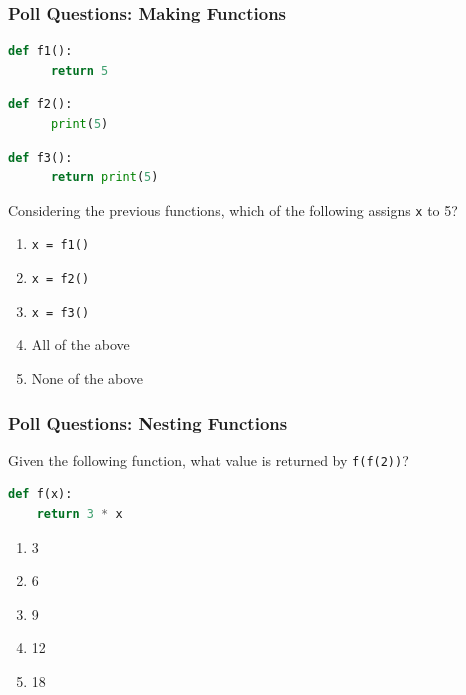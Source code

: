 \documentclass{beamer}
\begin{document}
%
%
\begin{frame}[fragile]
  \frametitle{Poll Questions: Making Functions}
  \begin{minipage}{0.29\textwidth}
    \centering
    \begin{lstlisting}[language=Python, autogobble]
    def f1():
      return 5
    \end{lstlisting}
  \end{minipage}
  \hfill
  \begin{minipage}{0.29\textwidth}
    \centering
    \begin{lstlisting}[language=Python, autogobble]
    def f2():
      print(5)
    \end{lstlisting}
  \end{minipage}
  \hfill
  \begin{minipage}{0.29\textwidth}
    \centering
    \begin{lstlisting}[language=Python, autogobble]
    def f3():
      return print(5)
    \end{lstlisting}
  \end{minipage}
  \vfill
  Considering the previous functions, which of the following assigns \lstinline|x| to 5?
  \centering
  \begin{enumerate}[A]
    \item \lstinline|x = f1()|
    \item \lstinline|x = f2()|
    \item \lstinline|x = f3()|
    \item All of the above
    \item None of the above
  \end{enumerate}
\end{frame}

%
%
\begin{frame}[fragile]
  \frametitle{Poll Questions: Nesting Functions}
  Given the following function, what value is returned by \lstinline|f(f(2))|?
  \begin{lstlisting}[language=Python, autogobble]
  def f(x):
    return 3 * x
  \end{lstlisting}
  \vfill
  \begin{enumerate}[A]
    \item 3
    \item 6
    \item 9
    \item 12
    \item 18
  \end{enumerate}
\end{frame}
\end{document}
